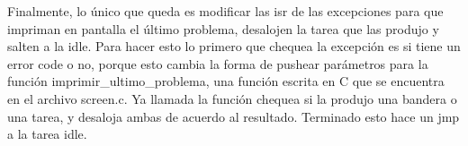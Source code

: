 \documentclass[10pt, a4paper]{article}
\begin{document}
Finalmente, lo \'unico que queda es modificar las isr de las excepciones para que impriman en pantalla el \'ultimo problema, desalojen la tarea que las produjo y salten a la idle.
Para hacer esto lo primero que chequea la excepci\'on es si tiene un error code o no, porque esto cambia la forma de pushear par\'ametros para la funci\'on imprimir\_ultimo\_problema, una funci\'on
escrita en C que se encuentra en el archivo screen.c. Ya llamada la funci\'on chequea si la produjo una bandera o una tarea, y desaloja ambas de acuerdo al resultado. Terminado esto hace un jmp a la
tarea idle. 
\end{document}
